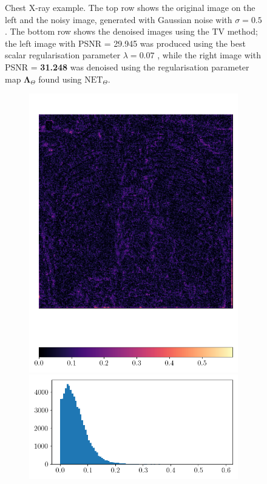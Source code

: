 \documentclass[12pt]{article}
\begin{document}
\begin{figure}[H]
  \caption{Chest X-ray example. The top row shows the original image on the left and the noisy image, generated with Gaussian noise with $\sigma = 0.5$. The bottom row shows the denoised images using the TV method; the left image with PSNR = 29.945 was produced using the best scalar regularisation parameter $\lambda = 0.07$ , while the right image with PSNR = \textbf{31.248} was denoised using the regularisation parameter map $\mathbf{\Lambda}_\Theta$ found using $\text{NET}_\Theta$.}
  \label{fig:compare}
\end{figure}





\begin{figure}[H]
  \centering
  \begin{subfigure}{0.48\textwidth}
  \includegraphics[width=1\linewidth]{images//chest_xray/ex_2/lambda_map.png}
  \includegraphics[width=1\linewidth]{images//chest_xray/ex_2/lambda_map_values_histogram.png}\

\end{subfigure}
\end{figure}
\end{document}

